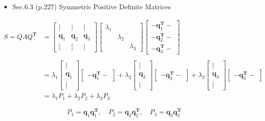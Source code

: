 \documentclass[letterpaper]{article}
\begin{document}
\begin{itemize}
  \item Sec.6.3 (p.227) Symmetric Positive Definite Matrices
\end{itemize}

\begin{align*}
  S = Q \Lambda Q^\mathbf{T}
&= \begin{bmatrix}
    | & | & |\\
    \bm{q}_1 & \bm{q}_2 & \bm{q}_3\\
    | & | & |
  \end{bmatrix}
  \begin{bmatrix}
    \lambda_1 \\
           & \lambda_2 & \\
           & & \lambda_3
  \end{bmatrix}
  \begin{bmatrix}
  - \bm{q}_1^\mathbf{T} -\\
  - \bm{q}_2^\mathbf{T} -\\
  - \bm{q}_3^\mathbf{T} -
  \end{bmatrix}\\
  \\
  &=
  \lambda_1 \begin{bmatrix}
    |\\
    \bm{q}_1\\
    |
  \end{bmatrix}
  \begin{bmatrix}
    - \bm{q}_1^\mathbf{T} - 
  \end{bmatrix}
  +
  \lambda_2 \begin{bmatrix}
  |\\
  \bm{q}_2\\
  |
  \end{bmatrix}
  \begin{bmatrix}
  - \bm{q}_2^\mathbf{T} -
  \end{bmatrix} 
  +
  \lambda_3 \begin{bmatrix}
    |\\
    \bm{q}_3 \\
    |
  \end{bmatrix}
  \begin{bmatrix}
    - \bm{q}_3^\mathbf{T} -
  \end{bmatrix} \\
&= \lambda_1 P_1 + \lambda_2 P_2 + \lambda_3 P_3
\end{align*}

\begin{equation*}
  P_1=\bm{q}_1 \bm{q}_1^\mathbf{T}, \quad P_2=\bm{q}_2 \bm{q}_2^\mathbf{T}, \quad P_3=\bm{q}_3 \bm{q}_3^\mathbf{T}
\end{equation*}
\end{document}
